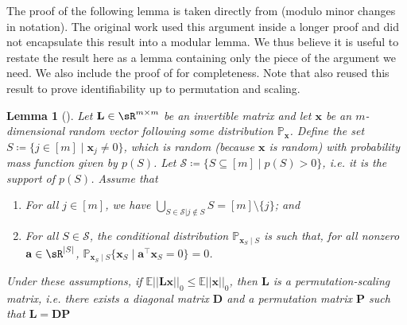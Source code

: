 \documentclass{article}
\newtheorem{lemma}[theorem]{Lemma}              %
\newcommand{\x}{\mathbf{x}}
\begin{document}
The proof of the following lemma is taken directly from \citet{lachapelle2023synergies} (modulo minor changes in notation). The original work used this argument inside a longer proof and did not encapsulate this result into a modular lemma. We thus believe it is useful to restate the result here as a lemma containing only the piece of the argument we need. We also include the proof of \citet{lachapelle2023synergies} for completeness. Note that \citet{xu2024sparsityprinciplepartiallyobservable} also reused this result to prove identifiability up to permutation and scaling.

\begin{lemma}[\citet{lachapelle2023synergies}]\label{lemma:synergies_proof}
Let $\mathbf{L} \in \sR^{m\times m}$ be an invertible matrix and let $\x$ be an $m$-dimensional random vector following some distribution $\mathbb{P}_\x$. Define the set $S \coloneqq \{j \in [m] \mid \x_j \not= 0\}$, which is random (because $\x$ is random) with probability mass function given by $p(S)$. Let $\mathcal{S} \coloneqq \{S \subseteq [m] \mid p(S) > 0\}$, i.e. it is the support of $p(S)$. Assume that
\begin{enumerate}
    \item For all $j \in [m]$, we have $\bigcup_{S \in \mathcal{S} | j \notin S} S = [m] \setminus \{j \}$; and
    \item For all $S \in \mathcal{S}$, the conditional distribution $\mathbb{P}_{\x_S \mid S}$ is such that, for all nonzero $\mathbf{a} \in \sR^{|S|}$, $\mathbb{P}_{\x_S \mid S}\{\x_S \mid \mathbf{a}^\top \x_S = 0\} = 0$.
\end{enumerate}
Under these assumptions, if $\mathbb{E}||\mathbf{L}\x||_0 \leq \mathbb{E}||\x||_0$, then $\mathbf{L}$ is a permutation-scaling matrix, i.e. there exists a diagonal matrix $\mathbf{D}$ and a permutation matrix $\mathbf{P}$ such that $\mathbf{L} = \mathbf{D}\mathbf{P}$ 
\end{lemma}
\end{document}
